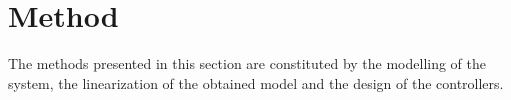 \section{Method}
The methods presented in this section are constituted by the modelling of the system, the linearization of the obtained model and the design of the controllers.